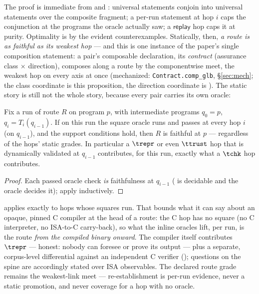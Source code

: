 The proof is immediate from  and :
universal statements conjoin into universal statements over the composite
fragment; a per-run statement at hop $i$ caps the conjunction at the
programs the oracle actually saw; a $\mathsf{replay}$ hop caps it at
purity. Optimality is by the evident counterexamples. Statically, then,
\emph{a route is as faithful as its weakest hop} --- and this is one
instance of the paper's single composition statement: a pair's
composable declaration, its \emph{contract} (assurance class $\times$
direction), composes along a route by the componentwise meet, the
weakest hop on every axis at once (mechanized:
\texttt{Contract.comp\_glb}, \S\ref{sec:mech}; the class coordinate is
this proposition, the direction coordinate is ). The
static story is still not the whole story, because every pair carries
its own oracle:

\begin{theorem}
\label{thm:reestablish}
Fix a run of route $R$ on program $p$, with intermediate programs
$q_0 = p$, $q_i = T_i(q_{i-1})$. If on this run the square oracle runs
and passes at every hop $i$ (on $q_{i-1}$), and the support conditions
hold, then $R$ is faithful at $p$ --- regardless of the hops' static
grades. In particular a $\trepr$ or even $\ttrust$ hop that is
dynamically validated at $q_{i-1}$ contributes, for this run, exactly
what a $\tchk$ hop contributes.
\end{theorem}

\begin{proof}
Each passed oracle check \emph{is} faithfulness at $q_{i-1}$
( is decidable and the oracle decides it); apply
 inductively.
\end{proof}

 applies exactly to hops whose squares run. That
bounds what it can say about an opaque, pinned C compiler at the head of
a route: the C hop has no square (no C interpreter, no ISA-to-C
carry-back), so what the inline oracles lift, per run, is the route
\emph{from the compiled binary onward}. The compiler itself contributes
$\trepr$ --- honest: nobody can foresee or prove its output --- plus a
separate, corpus-level differential against an independent C verifier
(); questions on the spine are accordingly
stated over ISA observables. The declared route grade remains the
weakest-link meet --- re-establishment is per-run evidence, never a
static promotion, and never coverage for a hop with no oracle.

